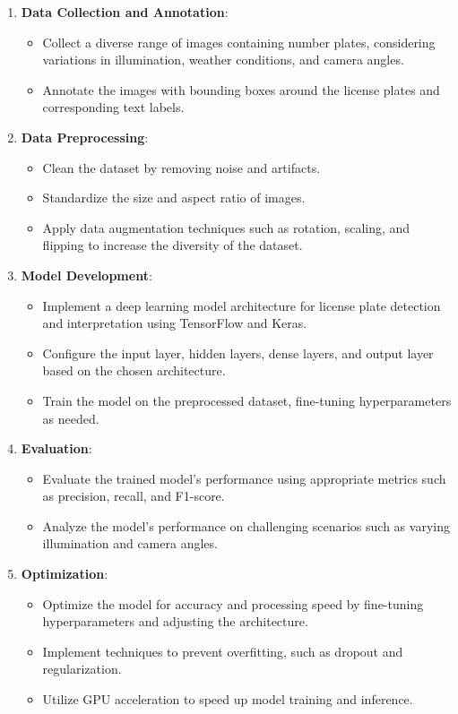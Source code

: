 \begin{enumerate}
	\item \textbf{Data Collection and Annotation}:
	\begin{itemize}
		\item Collect a diverse range of images containing number plates, considering variations in illumination, weather conditions, and camera angles.
		\item Annotate the images with bounding boxes around the license plates and corresponding text labels.
	\end{itemize}
	
	\item \textbf{Data Preprocessing}:
	\begin{itemize}
		\item Clean the dataset by removing noise and artifacts.
		\item Standardize the size and aspect ratio of images.
		\item Apply data augmentation techniques such as rotation, scaling, and flipping to increase the diversity of the dataset.
	\end{itemize}
	
	\item \textbf{Model Development}:
	\begin{itemize}
		\item Implement a deep learning model architecture for license plate detection and interpretation using TensorFlow and Keras.
		\item Configure the input layer, hidden layers, dense layers, and output layer based on the chosen architecture.
		\item Train the model on the preprocessed dataset, fine-tuning hyperparameters as needed.
	\end{itemize}
	
	\item \textbf{Evaluation}:
	\begin{itemize}
		\item Evaluate the trained model's performance using appropriate metrics such as precision, recall, and F1-score.
		\item Analyze the model's performance on challenging scenarios such as varying illumination and camera angles.
	\end{itemize}
	
	\item \textbf{Optimization}:
	\begin{itemize}
		\item Optimize the model for accuracy and processing speed by fine-tuning hyperparameters and adjusting the architecture.
		\item Implement techniques to prevent overfitting, such as dropout and regularization.
		\item Utilize GPU acceleration to speed up model training and inference.
	\end{itemize}
	

\end{enumerate}
